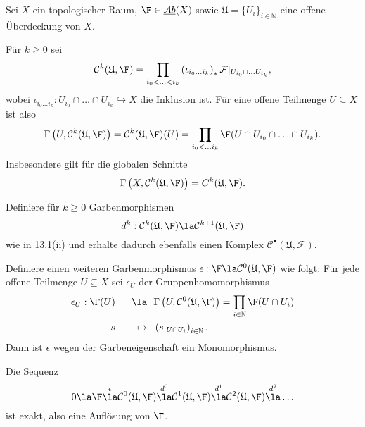 \documentclass[11pt]{book}
\theoremstyle{nonumberbreak}
\newenvironment{definprop}[1][]{\ifthenelse{\equal{#1}{}}{\definiprop}{\definiprop[#1]}\rm}{\enddefiniprop}
\newcommand{\AbX}{\underline{\mathcal{A}b}(X)}
\begin{document}
\begin{spacing}{1.4}
\begin{definprop}   %
Sei $X$ ein topologischer Raum, $\F \in \AbX$ sowie $\mathfrak{U}=\{U_i\}_{i \in \mathbb{N}}$ eine offene Überdeckung von $X$. 
\begin{compactenum}
\item Für $k \geqslant 0$ sei 
$$\mathcal{C}^{k}(\mathfrak{U}, \F) = \prod_{i_0< \ldots < i_k} \left( \iota_{i_0 \ldots i_k} \right)_{*} \mathcal{F}\vert_{U_{i_0} \cap \ldots U_{i_k}},$$
wobei $\iota_{i_0 \ldots i_k}: U_{i_0} \cap \ldots \cap U_{i_k} \hookrightarrow X$ die Inklusion ist. Für eine offene Teilmenge $U \subseteq X$ ist also
$$\Gamma\left(U, \mathcal{C}^{k}(\mathfrak{U}, \F)\right)=\mathcal{C}^{k}(\mathfrak{U}, \F)(U)= \prod_{i_0< \ldots i_k} \F(U \cap U_{i_0} \cap \ldots \cap U_{i_k}).$$
Insbesondere gilt für die globalen Schnitte
$$\Gamma\left(X, \mathcal{C}^{k}(\mathfrak{U}, \F) \right) = C^{k}(\mathfrak{U}, \F).$$
\item Definiere für $k \geqslant 0$ Garbenmorphismen 
$$d^{k}: \mathcal{C}^{k}(\mathfrak{U}, \F) \la \mathcal{C}^{k+1}(\mathfrak{U}, \F)$$
wie in 13.1(ii) und erhalte dadurch ebenfalls einen Komplex $\mathcal{C}^{\bullet}(\mathfrak{U}, \mathcal{F})$.
\item Definiere einen weiteren Garbenmorphismus $\epsilon: \F \la \mathcal{C}^{0}(\mathfrak{U}, \F)$ wie folgt: Für jede offene Teilmenge $U\subseteq X$ sei $\epsilon_U$ der Gruppenhomomorphismus
\setlength{\abovedisplayskip}{5.5pt}
\setlength{\belowdisplayskip}{5.5pt}
\begin{alignat*}{5}
\epsilon_U: \F(U) \ \ &&\la& \ \ \Gamma\left(U, \mathcal{C}^{0}(\mathfrak{U}, \F) \right) = \prod_{i \in \mathbb{N}} \F(U \cap U_i) \\
s \ \ &&\mapsto & \ \ \left(s\vert_{U \cap U_i} \right)_{i \in \mathbb{N}}.
\end{alignat*}
Dann ist $\epsilon$ wegen der Garbeneigenschaft ein Monomorphismus.

\item Die Sequenz
$$0 \la \F \overset{\epsilon}{\la} \mathcal{C}^{0}(\mathfrak{U}, \F) \overset{d^{0}}{\la} \mathcal{C}^{1}(\mathfrak{U}, \F) \overset{d^{1}}{\la} \mathcal{C}^{2}(\mathfrak{U}, \F) \overset{d^{2}}{\la} \ldots$$
ist exakt, also eine Auflösung von $\F$. 
\end{compactenum}


\end{definprop}
\end{spacing}
\end{document}
